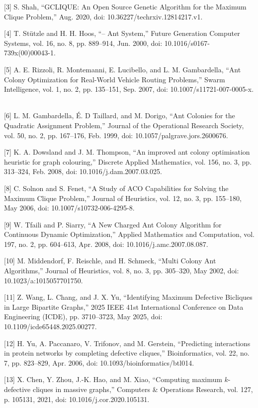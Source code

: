 \documentclass[conference]{IEEEtran}
\begin{document}
[3]
S. Shah, “GCLIQUE: An Open Source Genetic Algorithm for the Maximum Clique Problem,” Aug. 2020, doi: 10.36227/techrxiv.12814217.v1.
\


[4]
T. Stützle and H. H. Hoos, “– Ant System,” Future Generation Computer Systems, vol. 16, no. 8, pp. 889–914, Jun. 2000, doi: 10.1016/s0167-739x(00)00043-1.
\


[5]
A. E. Rizzoli, R. Montemanni, E. Lucibello, and L. M. Gambardella, “Ant Colony Optimization for Real-World Vehicle Routing Problems,” Swarm Intelligence, vol. 1, no. 2, pp. 135–151, Sep. 2007, doi: 10.1007/s11721-007-0005-x.
\


[6]
L. M. Gambardella, É. D Taillard, and M. Dorigo, “Ant Colonies for the Quadratic Assignment Problem,” Journal of the Operational Research Society, vol. 50, no. 2, pp. 167–176, Feb. 1999, doi: 10.1057/palgrave.jors.2600676.
\


[7]
K. A. Dowsland and J. M. Thompson, “An improved ant colony optimisation heuristic for graph colouring,” Discrete Applied Mathematics, vol. 156, no. 3, pp. 313–324, Feb. 2008, doi: 10.1016/j.dam.2007.03.025.
\


[8]
C. Solnon and S. Fenet, “A Study of ACO Capabilities for Solving the Maximum Clique Problem,” Journal of Heuristics, vol. 12, no. 3, pp. 155–180, May 2006, doi: 10.1007/s10732-006-4295-8.
\


[9] W. Tfaili and P. Siarry, “A New Charged Ant Colony Algorithm for Continuous Dynamic Optimization,” Applied Mathematics and Computation, vol. 197, no. 2, pp. 604–613, Apr. 2008, doi: 10.1016/j.amc.2007.08.087.
\

[10] M. Middendorf, F. Reischle, and H. Schmeck, “Multi Colony Ant Algorithms,” Journal of Heuristics, vol. 8, no. 3, pp. 305–320, May 2002, doi: 10.1023/a:1015057701750.
\

[11] Z. Wang, L. Chang, and J. X. Yu, “Identifying Maximum Defective Bicliques in Large Bipartite Graphs,” 2025 IEEE 41st International Conference on Data Engineering (ICDE), pp. 3710–3723, May 2025, doi: 10.1109/icde65448.2025.00277.
\

[12] H. Yu, A. Paccanaro, V. Trifonov, and M. Gerstein, “Predicting interactions in protein networks by completing defective cliques,” Bioinformatics, vol. 22, no. 7, pp. 823–829, Apr. 2006, doi: 10.1093/bioinformatics/btl014.
\

[13] X. Chen, Y. Zhou, J.-K. Hao, and M. Xiao, “Computing maximum $k$-defective cliques in massive graphs,” Computers \& Operations Research, vol. 127, p. 105131, 2021, doi: 10.1016/j.cor.2020.105131.
\
\end{document}
